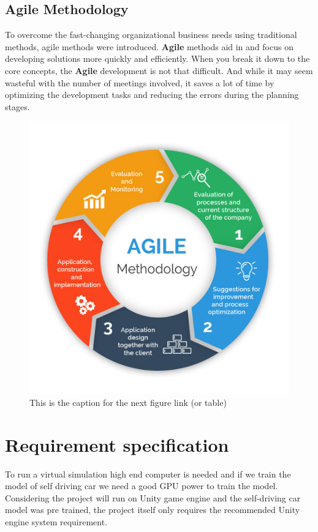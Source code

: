 \documentclass[11pt]{article}
\begin{document}
\subsection{Agile Methodology}
\label{sec:org26d740c}
To overcome the fast-changing organizational business needs using traditional methods,
agile methods were introduced. \textbf{Agile} methods aid in and focus on developing solutions
more quickly and efficiently. When you break it down to the core concepts, the \textbf{Agile}
development is not that difficult. And while it may seem wasteful with the number of
meetings involved, it saves a lot of time by optimizing the development tasks and
reducing the errors during the planning stages.
\begin{figure}[htbp]
\centering
\includegraphics[width=.9\linewidth]{./img/agile.png}
\caption{\label{fig:org90c0f76}This is the caption for the next figure link (or table)}
\end{figure}
\clearpage

\section{Requirement specification}
\label{sec:org6972cfe}
To run a virtual simulation high end computer is needed and if we train the model of self driving car
we need a good GPU power to train the model. Considering the project will run on Unity game engine and
the self-driving car model was pre trained, the project itself only requires the recommended Unity
engine system requirement.
\end{document}
